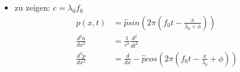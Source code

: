 \section{}
\begin{itemize}
\item zu zeigen: $c=\lambda_0 f_0$
\begin{align}
p(x,t) &=\hat{p}sin(2\pi (f_0 t - \frac{x}{\lambda_0 + \phi})) \\
\frac{d^2a}{dx^2} &=\frac{1}{c^2}\frac{d^2}{dt^2} \\
\frac{d^2p}{dx^2} &=\frac{d}{dx}-\hat{p}cos(2\pi (f_0 t- \frac{x}{\lambda_0}+\phi))
\end{align}
\end{itemize}